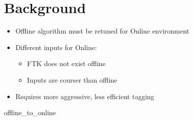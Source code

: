 \section{Background}

    { \begin{itemize}
        \item Offline algorithm must be retuned for Online environment
        \item Different inputs for Online:
            \begin{itemize}
                \item FTK does not exist offline
                \item Inputs are courser than offline
            \end{itemize} 
        \item Requires more aggressive, less efficient tagging
    \end{itemize} }
    {offline_to_online}


